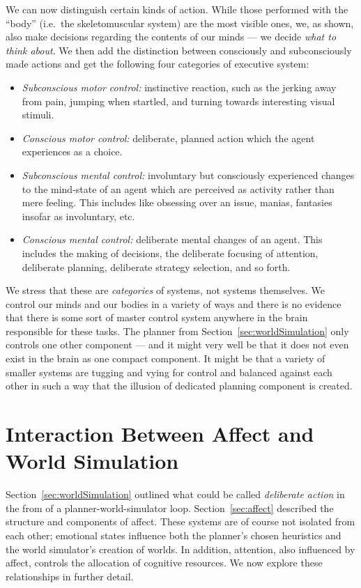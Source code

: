 We can now distinguish certain kinds of action. While those performed with the ``body'' (i.e.\ the skeletomuscular system) are the most visible ones, we, as shown, also make decisions regarding the contents of our minds --- we decide {\em what to think about}. We then add the distinction between consciously and subconsciously made actions and get the following four categories of executive system:

\begin{itemize}
	\item \emph{Subconscious motor control:} instinctive reaction, such as the jerking away from pain, jumping when startled, and turning towards interesting visual stimuli.
	\item \emph{Conscious motor control:} deliberate, planned action which the agent experiences as a choice.
	\item \emph{Subconscious mental control:} involuntary but consciously experienced changes to the mind-state of an agent which are perceived as activity rather than mere feeling. This includes like obsessing over an issue, manias, fantasies insofar as involuntary, etc.
	\item \emph{Conscious mental control:} deliberate mental changes of an agent. This includes the making of decisions, the deliberate focusing of attention, deliberate planning, deliberate strategy selection, and so forth.
\end{itemize}

We stress that these are {\em categories} of systems, not systems themselves. We control our minds and our bodies in a variety of ways and there is no evidence that there is some sort of master control system anywhere in the brain responsible for these tasks. The planner from Section~\ref{sec:worldSimulation} only controls one other component --- and it might very well be that it does not even exist in the brain as one compact component. It might be that a variety of smaller systems are tugging and vying for control and balanced against each other in such a way that the illusion of dedicated planning component is created.

\section{Interaction Between Affect and World Simulation}\label{sec:interactionBetween}

Section~\ref{sec:worldSimulation} outlined what could be called {\em deliberate action} in the from of a planner-world-simulator loop. Section~\ref{sec:affect} described the structure and components of affect. These systems are of course not isolated from each other; emotional states influence both the planner's chosen heuristics and the world simulator's creation of worlds. In addition, attention, also influenced by affect, controls the allocation of cognitive resources. We now explore these relationships in further detail.

